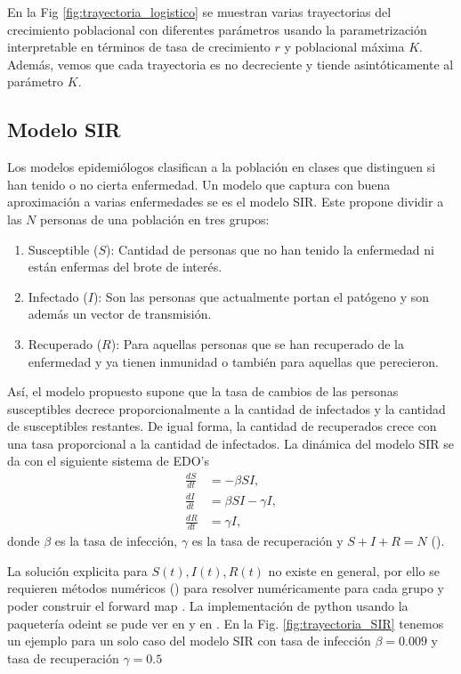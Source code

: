 En la Fig \ref{fig:trayectoria_logistico} se muestran varias trayectorias del crecimiento poblacional con diferentes parámetros usando la parametrización interpretable en términos de tasa de crecimiento $r$ y poblacional máxima $K$. Además, vemos que cada trayectoria es no decreciente y tiende asintóticamente al parámetro $K$. 

\subsection{Modelo SIR}

Los modelos epidemiólogos clasifican a la población en clases que distinguen si han tenido o no cierta enfermedad. Un modelo que captura con buena aproximación a varias enfermedades se es el modelo SIR. Este propone dividir a las $N$ personas de una población en tres grupos:
\begin{enumerate}
    \item Susceptible ($S$): Cantidad de personas que no han tenido la enfermedad ni están enfermas del brote de interés.
    \item Infectado ($I$): Son las personas que actualmente portan el patógeno y son además un vector de transmisión.
    \item Recuperado ($R$): Para aquellas personas que se han recuperado de la enfermedad y ya tienen inmunidad o también para aquellas que perecieron.
\end{enumerate}

Así, el modelo propuesto supone que la tasa de cambios de las personas susceptibles decrece proporcionalmente a la cantidad de infectados y la cantidad de susceptibles restantes. De igual forma, la cantidad de recuperados crece con una tasa proporcional a la cantidad de infectados. La dinámica del modelo SIR se da con el siguiente sistema de EDO's
\begin{align}
    \frac{dS}{dt} &= -\beta S I, \nonumber \\
    \frac{dI}{dt} &= \beta S I - \gamma I,
    \label{3.1.3.01} \\
    \frac{dR}{dt} &= \gamma I, \nonumber
\end{align}
donde $\beta$ es la tasa de infección, $\gamma$ es la tasa de recuperación y $S + I + R = N$ (\cite{weiss2013sir}).

La solución explicita para $S(t), I(t), R(t)$ no existe en general, por ello se requieren métodos numéricos (\cite{mathews2000metodos}) para resolver numéricamente para cada grupo y poder construir el forward map . La implementación de python usando la paquetería odeint se pude ver en \cite{jimenez2022metodos} y en \cite{griffiths2010numerical}. En la Fig. \ref{fig:trayectoria_SIR} tenemos un ejemplo para un solo caso del modelo SIR con tasa de infección $\beta = 0.009$ y tasa de recuperación $\gamma = 0.5$

